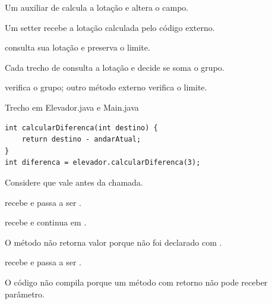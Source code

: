 \documentclass[11pt,a4paper]{article}
\begin{document}
\begin{minipage}[t]{.485\textwidth}
\begin{alternativas}
\item Um auxiliar de  calcula a lotação e altera o campo.
\item Um setter recebe a lotação calculada pelo código externo.
\item {} consulta sua lotação e preserva o limite.
\item Cada trecho de  consulta a lotação e decide se soma o grupo.
\item {} verifica o grupo; outro método externo verifica o limite.
\end{alternativas}
\begin{painelEvolucao}{Trecho em Elevador.java e Main.java}
\begin{lstlisting}[style=cenariocodigo]
int calcularDiferenca(int destino) {
    return destino - andarAtual;
}
int diferenca = elevador.calcularDiferenca(3);
\end{lstlisting}
\end{painelEvolucao}
Considere que  vale  antes da chamada.
\begin{alternativas}
\item {} recebe  e  passa a ser .
\item {} recebe  e  continua em .
\item O método não retorna valor porque não foi declarado com .
\item {} recebe  e  passa a ser .
\item O código não compila porque um método com retorno  não pode receber parâmetro.
\end{alternativas}

\end{minipage}
\end{document}
